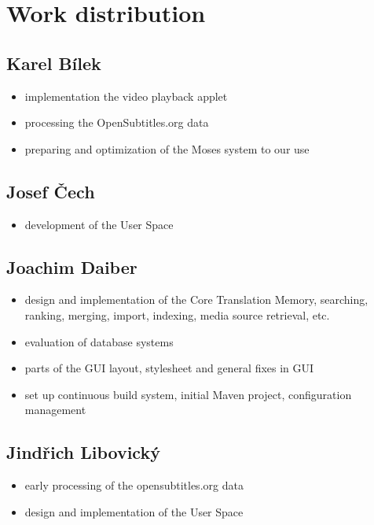 {\section{Work distribution}

\subsection*{Karel Bílek}

\begin{itemize}
	\item implementation the video playback applet
	\item processing the OpenSubtitles.org data
	\item preparing and optimization of the Moses system to our use
\end{itemize}

\subsection*{Josef Čech}

\begin{itemize}
	\item development of the User Space
\end{itemize}

\subsection*{Joachim Daiber}

\begin{itemize}
	\item design and implementation of the Core Translation Memory, searching, ranking, merging, import, indexing, media source retrieval, etc.
	\item evaluation of database systems
	\item parts of the GUI layout, stylesheet and general fixes in GUI
	\item set up continuous build system, initial Maven project, configuration management
\end{itemize}



\subsection*{Jindřich Libovický}

\begin{itemize}
	\item early processing of the opensubtitles.org data
	\item design and implementation of the User Space
\end{itemize}


}
